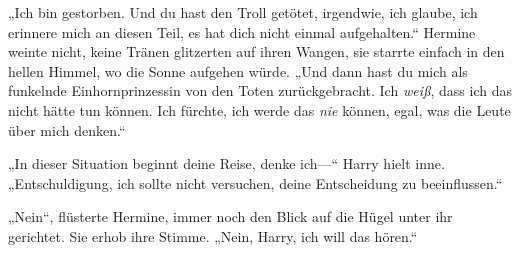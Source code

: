 „Ich bin gestorben. Und du hast den Troll getötet, irgendwie, ich glaube, ich erinnere mich an diesen Teil, es hat dich nicht einmal aufgehalten.“ Hermine weinte nicht, keine Tränen glitzerten auf ihren Wangen, sie starrte einfach in den hellen Himmel, wo die Sonne aufgehen würde. „Und dann hast du mich als funkelnde Einhornprinzessin von den Toten zurückgebracht. Ich \emph{weiß}, dass ich das nicht hätte tun können. Ich fürchte, ich werde das \emph{nie} können, egal, was die Leute über mich denken.“

„In dieser Situation beginnt deine Reise, denke ich—“ Harry hielt inne. „Entschuldigung, ich sollte nicht versuchen, deine Entscheidung zu beeinflussen.“

„Nein“, flüsterte Hermine, immer noch den Blick auf die Hügel unter ihr gerichtet. Sie erhob ihre Stimme. „Nein, Harry, ich will das hören.“

